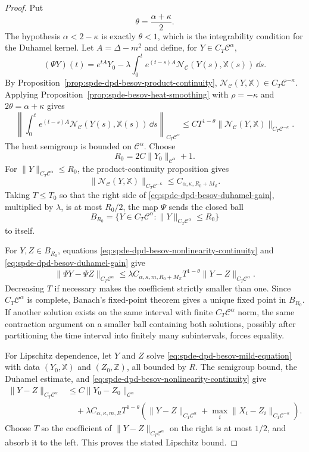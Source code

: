 \begin{proof}
Put
\[
  \theta=\frac{\alpha+\kappa}{2}.
\]
The hypothesis \(\alpha<2-\kappa\) is exactly \(\theta<1\), which is the
integrability condition for the Duhamel kernel.  Let \(A=\Delta-m^2\) and
define, for \(Y\in C_T\mathcal C^\alpha\),
\[
  (\Psi Y)(t)
  =
  e^{tA}Y_0
  -
  \lambda
  \int_0^t
  e^{(t-s)A}\mathcal N_{\mathcal C}(Y(s),\mathbb X(s))\,\dd s .
\]
By Proposition~\ref{prop:spde-dpd-besov-product-continuity},
\(\mathcal N_{\mathcal C}(Y,\mathbb X)\in C_T\mathcal C^{-\kappa}\).
Applying Proposition~\ref{prop:spde-besov-heat-smoothing} with
\(\rho=-\kappa\) and \(2\theta=\alpha+\kappa\) gives
\begin{equation}
  \left\|
    \int_0^t
    e^{(t-s)A}
    \mathcal N_{\mathcal C}(Y(s),\mathbb X(s))\,\dd s
  \right\|_{C_T\mathcal C^\alpha}
  \leq
  C T^{1-\theta}
  \|\mathcal N_{\mathcal C}(Y,\mathbb X)\|_{C_T\mathcal C^{-\kappa}} .
  \label{eq:spde-dpd-besov-duhamel-gain}
\end{equation}
The heat semigroup is bounded on \(\mathcal C^\alpha\).  Choose
\[
  R_0=2C\|Y_0\|_{\mathcal C^\alpha}+1 .
\]
For \(\|Y\|_{C_T\mathcal C^\alpha}\leq R_0\), the product-continuity
proposition gives
\[
  \|\mathcal N_{\mathcal C}(Y,\mathbb X)\|_{C_T\mathcal C^{-\kappa}}
  \leq
  C_{\alpha,\kappa,R_0+M_{\mathbb X}} .
\]
Taking \(T\leq T_0\) so that the right side of
\eqref{eq:spde-dpd-besov-duhamel-gain}, multiplied by \(\lambda\), is at
most \(R_0/2\), the map \(\Psi\) sends the closed ball
\[
  B_{R_0}=\{Y\in C_T\mathcal C^\alpha:
    \|Y\|_{C_T\mathcal C^\alpha}\leq R_0\}
\]
to itself.

For \(Y,Z\in B_{R_0}\), equations
\eqref{eq:spde-dpd-besov-nonlinearity-continuity} and
\eqref{eq:spde-dpd-besov-duhamel-gain} give
\[
  \|\Psi Y-\Psi Z\|_{C_T\mathcal C^\alpha}
  \leq
  \lambda C_{\alpha,\kappa,m,R_0+M_{\mathbb X}}
  T^{1-\theta}
  \|Y-Z\|_{C_T\mathcal C^\alpha}.
\]
Decreasing \(T\) if necessary makes the coefficient strictly smaller than
one.  Since \(C_T\mathcal C^\alpha\) is complete, Banach's fixed-point
theorem gives a unique fixed point in \(B_{R_0}\).  If another solution
exists on the same interval with finite \(C_T\mathcal C^\alpha\) norm, the
same contraction argument on a smaller ball containing both solutions,
possibly after partitioning the time interval into finitely many subintervals,
forces equality.

For Lipschitz dependence, let \(Y\) and \(Z\) solve
\eqref{eq:spde-dpd-besov-mild-equation} with data
\((Y_0,\mathbb X)\) and \((Z_0,\mathbb Z)\), all bounded by \(R\).  The
semigroup bound, the Duhamel estimate, and
\eqref{eq:spde-dpd-besov-nonlinearity-continuity} give
\[
\begin{aligned}
  \|Y-Z\|_{C_T\mathcal C^\alpha}
  &\leq
  C\|Y_0-Z_0\|_{\mathcal C^\alpha}
\\
  &\quad+
  \lambda C_{\alpha,\kappa,m,R}
  T^{1-\theta}
  \left(
    \|Y-Z\|_{C_T\mathcal C^\alpha}
    +
    \max_i\|X_i-Z_i\|_{C_T\mathcal C^{-\kappa}}
  \right).
\end{aligned}
\]
Choose \(T\) so the coefficient of
\(\|Y-Z\|_{C_T\mathcal C^\alpha}\) on the right is at most \(1/2\), and
absorb it to the left.  This proves the stated Lipschitz bound.
\end{proof}


